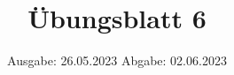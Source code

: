 

\title{Übungsblatt 6}
\date{%
  Ausgabe: 26.05.2023 %
  \hspace{3em}
  Abgabe: 02.06.2023 %
}



\maketitle
\thispagestyle{empty}
\tableofcontents
\newpage



%


